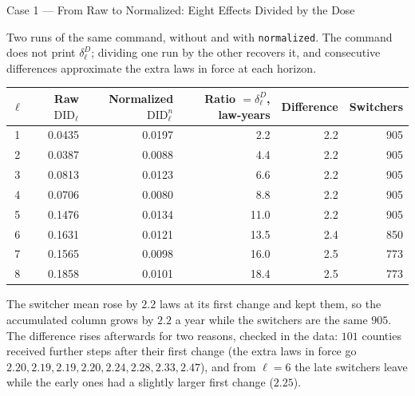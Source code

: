 \documentclass[main.tex]{subfiles}
\begin{document}
\begin{frame}{Case 1 --- From Raw to Normalized: Eight Effects Divided by the Dose}

  \footnotesize
  Two runs of the same command, without and with \texttt{normalized}. The
  command does not print $\delta^{D}_\ell$; dividing one run by the other
  recovers it, and consecutive differences approximate the extra laws in
  force at each horizon.

  \smallskip
  \begin{center}
  \begin{tabular}{@{}crrrrr@{}}
    \toprule
    $\ell$ & Raw $\text{DID}_\ell$ & Normalized $\text{DID}^{n}_\ell$ & Ratio $= \delta^{D}_\ell$, law-years & Difference & Switchers \\
    \midrule
    1 & 0.0435 & 0.0197 & 2.2  & 2.2 & 905 \\
    2 & 0.0387 & 0.0088 & 4.4  & 2.2 & 905 \\
    3 & 0.0813 & 0.0123 & 6.6  & 2.2 & 905 \\
    4 & 0.0706 & 0.0080 & 8.8  & 2.2 & 905 \\
    5 & 0.1476 & 0.0134 & 11.0 & 2.2 & 905 \\
    6 & 0.1631 & 0.0121 & 13.5 & 2.4 & 850 \\
    7 & 0.1565 & 0.0098 & 16.0 & 2.5 & 773 \\
    8 & 0.1858 & 0.0101 & 18.4 & 2.5 & 773 \\
    \bottomrule
  \end{tabular}
  \end{center}

  \smallskip
  The switcher mean rose by $2.2$ laws at its first change and kept them, so
  the accumulated column grows by $2.2$ a year while the switchers are the
  same $905$. The difference rises afterwards for two reasons, checked in the
  data: $101$ counties received further steps after their first change (the
  extra laws in force go $2.20, 2.19, 2.19, 2.20, 2.24, 2.28, 2.33, 2.47$),
  and from $\ell = 6$ the late switchers leave while the early ones had a
  slightly larger first change ($2.25$).

\end{frame}
\end{document}
